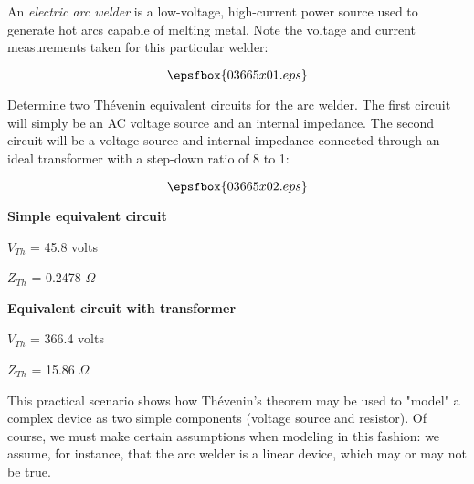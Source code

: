 

An {\it electric arc welder} is a low-voltage, high-current power source used to generate hot arcs capable of melting metal.  Note the voltage and current measurements taken for this particular welder:

$$\epsfbox{03665x01.eps}$$

Determine two Th\'evenin equivalent circuits for the arc welder.  The first circuit will simply be an AC voltage source and an internal impedance.  The second circuit will be a voltage source and internal impedance connected through an ideal transformer with a step-down ratio of 8 to 1:

$$\epsfbox{03665x02.eps}$$







\noindent
{\bf Simple equivalent circuit}

$V_{Th}$ = 45.8 volts

$Z_{Th}$ = 0.2478 $\Omega$

\vskip 10pt

\noindent
{\bf Equivalent circuit with transformer}

$V_{Th}$ = 366.4 volts

$Z_{Th}$ = 15.86 $\Omega$







This practical scenario shows how Th\'evenin's theorem may be used to "model" a complex device as two simple components (voltage source and resistor).  Of course, we must make certain assumptions when modeling in this fashion: we assume, for instance, that the arc welder is a linear device, which may or may not be true.




